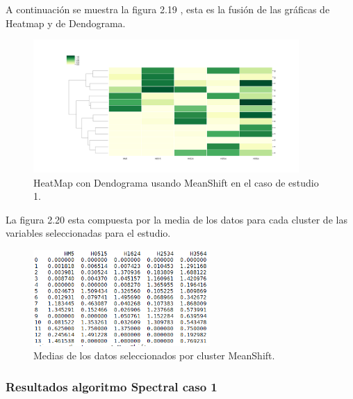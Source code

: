 	A continuación se muestra la figura 2.19 , esta es la fusión de las gráficas de 
	Heatmap y de Dendograma.  \\

	\begin{figure}[htb]
		\centering
		\includegraphics[width=0.9\textwidth]{./imagenes/caso1/heatmapcondendograma_caso1_MeanShift}
		\caption{HeatMap con Dendograma usando MeanShift en el caso de estudio 1.} \label{fig:1}
	\end{figure}

	La figura 2.20 esta compuesta por la media de los datos para cada cluster de las variables seleccionadas
	para el estudio. \\ 

	\begin{figure}[htb]
		\centering
		\includegraphics[width=0.6\textwidth]{./imagenes/caso1/medias_datos_caso1_MeanShift}
		\caption{Medias de los datos seleccionados por cluster MeanShift.} \label{fig:1}
	\end{figure}


	\subsubsection{Resultados algoritmo Spectral caso 1}

